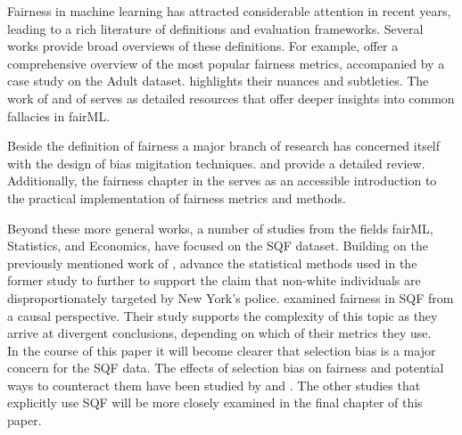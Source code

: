Fairness in machine learning has attracted considerable attention in recent years, leading to a rich literature of definitions and evaluation frameworks. Several works provide broad overviews of these definitions. For example, \cite{verma2018} offer a comprehensive overview of the most popular fairness metrics, accompanied by a case study on the Adult dataset. \cite{castelnovo2022} highlights their nuances and subtleties. The work of \cite{corbett-davies} and of \cite{barocas} serves as detailed resources that offer deeper insights into common fallacies in fairML.

Beside the definition of fairness a major branch of research has concerned itself with the design of bias migitation techniques. \cite{mehrabi2022} and \cite{caton2024} provide a detailed review. Additionally, the fairness chapter in the \cite{mlr3_book} serves as an accessible introduction to the practical implementation of fairness metrics and methods.

Beyond these more general works, a number of studies from the fields fairML, Statistics, and Economics, have focused on the SQF dataset. Building on the previously mentioned work of \cite{gelman2007}, \cite{goel2016} advance the statistical methods used in the former study to further to support the claim that non-white individuals are disproportionately targeted by New York's police.
\cite{Khademi2019FADMELC} examined fairness in SQF from a causal perspective. Their study supports the complexity of this topic as they arrive at divergent conclusions, depending on which of their metrics they use.\\
In the course of this paper it will become clearer that selection bias is a major concern for the SQF data. The effects of selection bias on fairness and potential ways to counteract them have been studied by \cite{Lakkaraju2017SLPEAPPU} and \cite{favier2023}.
The other studies that explicitly use SQF \cite{Badr2022DTFANSP, RambachanBBOEFW, kallus2018} will be more closely examined in the final chapter of this paper.

